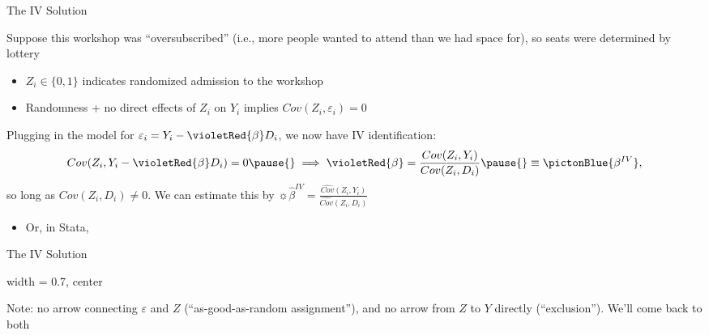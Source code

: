 \documentclass{beamer}
\begin{document}
\begin{frame}{The IV Solution}

Suppose this workshop was ``oversubscribed'' (i.e., more people wanted to attend than we had space for), so seats were determined by lottery
\begin{itemize}
\item $Z_i\in\{0,1\}$ indicates randomized admission to the workshop\pause{}
\item Randomness + no direct effects of $Z_i$ on $Y_i$ implies $Cov(Z_i,\varepsilon_i)=0$
\end{itemize}\medskip\pause{}

Plugging in the model for $\varepsilon_i=Y_i-\violetRed{\beta} D_i$, we now have IV identification:
\begin{align*}
Cov(Z_i,Y_i-\violetRed{\beta} D_i)=0 \pause{} \implies \violetRed{\beta} = \frac{Cov(Z_i,Y_i)}{Cov(Z_i,D_i)}\pause{}\equiv \pictonBlue{\beta^{IV}},
\end{align*}
so long as $Cov(Z_i,D_i)\neq 0$.\pause{} We can estimate this by $\sun{\widehat{\beta}^{IV}}=\frac{\widehat{Cov}(Z_i,Y_i)}{\widehat{Cov}(Z_i,D_i)}$\pause{}
\begin{itemize}
\item Or, in Stata, 
\end{itemize}

\end{frame}

\begin{frame}{The IV Solution}
  \begin{adjustbox}{width = 0.7\textwidth, center}
  \end{adjustbox}
\bigskip

Note: no arrow connecting $\varepsilon$ and $Z$ (``as-good-as-random assignment''), and no arrow from $Z$ to $Y$ directly (``exclusion''). We'll come back to both
\end{frame}
\end{document}
